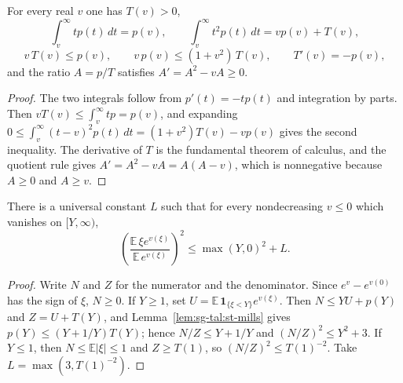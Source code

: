 \begin{lemma}\label{lem:sg-tal:st-mills}
  \leanok
{}
For every real $v$ one has $T(v)>0$,
\[
\int_v^\infty tp(t)\,dt=p(v),\qquad\int_v^\infty t^2p(t)\,dt=vp(v)+T(v),
\]
\[
v\,T(v)\le p(v),\qquad v\,p(v)\le(1+v^2)\,T(v),\qquad T'(v)=-p(v),
\]
and the ratio $A=p/T$ satisfies $A'=A^2-vA\ge0$.
\end{lemma}
\begin{proof}
  \leanok
The two integrals follow from $p'(t)=-tp(t)$ and integration by parts. Then
$vT(v)\le\int_v^\infty tp=p(v)$, and expanding
$0\le\int_v^\infty(t-v)^2p(t)\,dt=(1+v^2)T(v)-vp(v)$ gives the second inequality. The derivative of $T$ is the
fundamental theorem of calculus, and the quotient rule gives $A'=A^2-vA=A(A-v)$, which is nonnegative because
$A\ge0$ and $A\ge v$.
\end{proof}

\begin{lemma}\label{lem:sg-tal:st-ratio}
  \leanok
There is a universal constant $L$ such that for every nondecreasing $v\le0$ which vanishes on $[Y,\infty)$,
\[
\left(\frac{\mathbb E\,\xi e^{v(\xi)}}{\mathbb E\,e^{v(\xi)}}\right)^2\le\max(Y,0)^2+L .
\]
\end{lemma}
\begin{proof}
  \leanok
Write $N$ and $Z$ for the numerator and the denominator. Since $e^v-e^{v(0)}$ has the sign of $\xi$,
$N\ge0$. If $Y\ge1$, set $U=\mathbb E\,\mathbf 1_{\{\xi<Y\}}e^{v(\xi)}$. Then $N\le YU+p(Y)$ and $Z=U+T(Y)$,
and Lemma~\ref{lem:sg-tal:st-mills} gives $p(Y)\le(Y+1/Y)T(Y)$; hence $N/Z\le Y+1/Y$ and
$(N/Z)^2\le Y^2+3$. If $Y\le1$, then $N\le\mathbb E|\xi|\le1$ and $Z\ge T(1)$, so $(N/Z)^2\le T(1)^{-2}$.
Take $L=\max(3,T(1)^{-2})$.
\end{proof}

